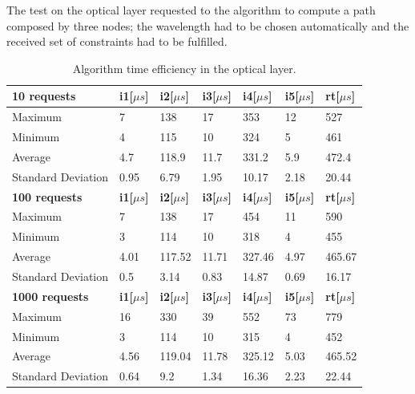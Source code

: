 \documentclass[10pt,a4paper]{report}
\begin{document}
The test on the optical layer requested to the algorithm to compute a
path composed by three nodes; the wavelength had to be chosen
automatically and the received set of constraints had to be fulfilled.
\begin{table}[!htbp]
  \begin{center}
    \begin{tabular}{|l||l|l|l|l|l||l|}
      \hline
      \textbf{10 requests} & \textbf{i1[\(\mu s\)]} & \textbf{i2[\(\mu s\)]} & \textbf{i3[\(\mu s\)]} & \textbf{i4[\(\mu s\)]} &
      \textbf{i5[\(\mu s\)]} & \textbf{rt[\(\mu s\)]} \\\hline
      Maximum & 7 & 138 & 17 & 353 & 12 & 527 \\
      Minimum & 4 & 115 & 10 & 324 & 5 & 461 \\
      Average & 4.7 & 118.9 & 11.7 & 331.2 & 5.9 & 472.4 \\
      Standard Deviation & 0.95 & 6.79 & 1.95 & 10.17 & 2.18 & 20.44
      \\ \hline
      \textbf{100 requests} & \textbf{i1[\(\mu s\)]} & \textbf{i2[\(\mu s\)]} & \textbf{i3[\(\mu s\)]} & \textbf{i4[\(\mu s\)]} &
      \textbf{i5[\(\mu s\)]} & \textbf{rt[\(\mu s\)]} \\\hline
      Maximum & 7 & 138 & 17 & 454 & 11 & 590 \\
      Minimum & 3 & 114 & 10 & 318 & 4 & 455 \\
      Average & 4.01 & 117.52 & 11.71 & 327.46 & 4.97 & 465.67 \\
      Standard Deviation & 0.5 & 3.14 & 0.83 & 14.87 & 0.69 & 16.17
      \\ \hline
      \textbf{1000 requests} & \textbf{i1[\(\mu s\)]} & \textbf{i2[\(\mu s\)]} & \textbf{i3[\(\mu s\)]} & \textbf{i4[\(\mu s\)]} &
      \textbf{i5[\(\mu s\)]} & \textbf{rt[\(\mu s\)]} \\\hline
      Maximum & 16 & 330 & 39 & 552 & 73 & 779 \\
      Minimum & 3 & 114 & 10 & 315 & 4 & 452 \\
      Average & 4.56 & 119.04 & 11.78 & 325.12 & 5.03 & 465.52 \\
      Standard Deviation & 0.64 & 9.2 & 1.34 & 16.36 & 2.23 & 22.44 \\
      \hline
    \end{tabular}
    \caption[Algorithm time efficiency in the optical layer]{Algorithm time
      efficiency in the optical layer.}
    \label{tab:test_opt}
  \end{center}
\end{table}
\end{document}
